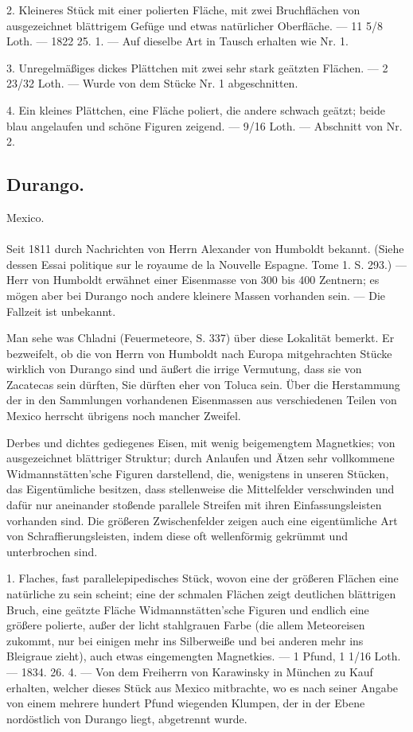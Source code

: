 \documentclass[a4paper, 11pt, oneside, polutonikogreek, german]{article}
\begin{document}
2. Kleineres Stück mit einer polierten Fläche, mit zwei Bruchflächen von ausgezeichnet blättrigem Gefüge und etwas natürlicher Oberfläche. — 11 5/8 Loth. — 1822 25. 1. — Auf dieselbe Art in Tausch erhalten wie Nr. 1.

3. Unregelmäßiges dickes Plättchen mit zwei sehr stark geätzten Flächen. — 2 23/32 Loth. — Wurde von dem Stücke Nr. 1 abgeschnitten.

4. Ein kleines Plättchen, eine Fläche poliert, die andere schwach geätzt; beide blau angelaufen und schöne Figuren zeigend. — 9/16 Loth. — Abschnitt von Nr. 2.
\subsection{Durango.}
\begin{center}
\small
Mexico.
\end{center}
\paragraph{}
Seit 1811 durch Nachrichten von Herrn Alexander von Humboldt bekannt. (Siehe dessen Essai politique sur le royaume de la Nouvelle Espagne. Tome 1. S. 293.) — Herr von Humboldt erwähnet einer Eisenmasse von 300 bis 400 Zentnern; es mögen aber bei Durango noch andere kleinere Massen vorhanden sein. — Die Fallzeit ist unbekannt.

Man sehe was Chladni (Feuermeteore, S. 337) über diese Lokalität bemerkt. Er bezweifelt, ob die von Herrn von Humboldt nach Europa mitgehrachten Stücke wirklich von Durango sind und äußert die irrige Vermutung, dass sie von Zacatecas sein dürften, Sie dürften eher von Toluca sein. Über die Herstammung der in den Sammlungen vorhandenen Eisenmassen aus verschiedenen Teilen von Mexico herrscht übrigens noch mancher Zweifel.

Derbes und dichtes gediegenes Eisen, mit wenig beigemengtem Magnetkies; von ausgezeichnet blättriger Struktur; durch Anlaufen und Ätzen sehr vollkommene Widmannstätten'sche Figuren darstellend, die, wenigstens in unseren Stücken, das Eigentümliche besitzen, dass stellenweise die Mittelfelder verschwinden und dafür nur aneinander stoßende parallele Streifen mit ihren Einfassungsleisten vorhanden sind. Die größeren Zwischenfelder zeigen auch eine eigentümliche Art von Schraffierungsleisten, indem diese oft wellenförmig gekrümmt und unterbrochen sind.

1. Flaches, fast parallelepipedisches Stück, wovon eine der größeren Flächen eine natürliche zu sein scheint; eine der schmalen Flächen zeigt deutlichen blättrigen Bruch, eine geätzte Fläche Widmannstätten'sche Figuren und endlich eine größere polierte, außer der licht stahlgrauen Farbe (die allem Meteoreisen zukommt, nur bei einigen mehr ins Silberweiße und bei anderen mehr ins Bleigraue zieht), auch etwas eingemengten Magnetkies. — 1 Pfund, 1 1/16 Loth. — 1834. 26. 4. — Von dem Freiherrn von Karawinsky in München zu Kauf erhalten, welcher dieses Stück aus Mexico mitbrachte, wo es nach seiner Angabe von einem mehrere hundert Pfund wiegenden Klumpen, der in der Ebene nordöstlich von Durango liegt, abgetrennt wurde.
\end{document}

